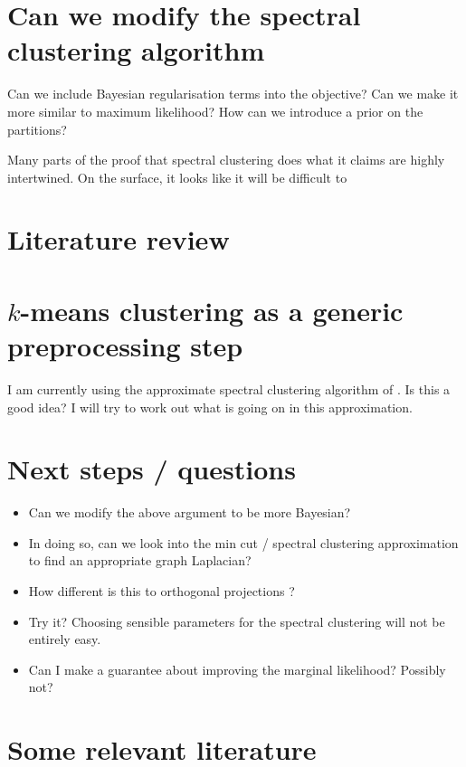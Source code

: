 \documentclass{article}
\numberwithin{equation}{section}
\numberwithin{thm}{section}
\begin{document}
\section{Can we modify the spectral clustering algorithm}

Can we include Bayesian regularisation terms into the objective?
Can we make it more similar to maximum likelihood?
How can we introduce a prior on the partitions?

Many parts of the proof that spectral clustering does what it claims are highly intertwined.
On the surface, it looks like it will be difficult to 

\section{Literature review}


\cite{Griffiths2011}
\cite{Luxburg2007}
\cite{Cui2007}
\cite{Niu2010}
\cite{Niu2011}
\cite{Niu2012}
\cite{Qi2009}
\cite{Davidson2008}

\section{$k$-means clustering as a generic preprocessing step}

I am currently using the approximate spectral clustering algorithm of \cite{Yan2009}.
Is this a good idea?
I will try to work out what is going on in this approximation.

\section{Next steps / questions}
\begin{itemize}
\item Can we modify the above argument to be more Bayesian?
\item In doing so, can we look into the min cut / spectral clustering approximation to find an appropriate graph Laplacian?
\item How different is this to orthogonal projections \citep{Cui2007}?
\item Try it? Choosing sensible parameters for the spectral clustering will not be entirely easy.
\item Can I make a guarantee about improving the marginal likelihood? Possibly not?
\end{itemize}

\section{Some relevant literature}


\small{

%

}
\end{document}
